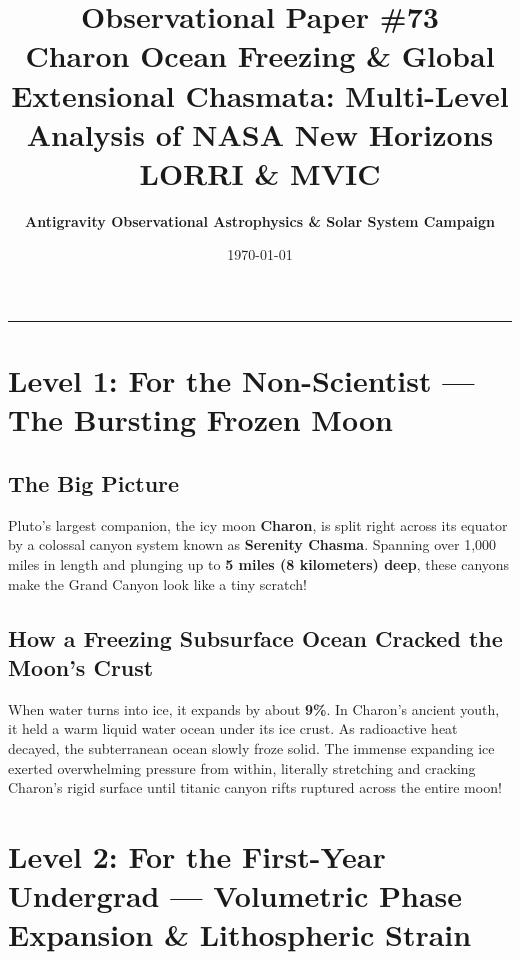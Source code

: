 \documentclass[11pt,a4paper]{article}
\title{\Huge \textbf{Observational Paper \#73}\\ \Large Charon Ocean Freezing \& Global Extensional Chasmata: Multi-Level Analysis of NASA New Horizons LORRI \& MVIC}
\author{\textbf{Antigravity Observational Astrophysics \& Solar System Campaign}}
\date{\today}
\begin{document}
\maketitle

\vspace{-1em}
\begin{center}
\rule{\textwidth}{1.5pt}
\end{center}

\section*{Level 1: For the Non-Scientist — The Bursting Frozen Moon}

\subsection*{The Big Picture}
Pluto's largest companion, the icy moon \textbf{Charon}, is split right across its equator by a colossal canyon system known as \textbf{Serenity Chasma}. Spanning over 1,000 miles in length and plunging up to \textbf{5 miles (8 kilometers) deep}, these canyons make the Grand Canyon look like a tiny scratch!

\subsection*{How a Freezing Subsurface Ocean Cracked the Moon's Crust}
When water turns into ice, it expands by about \textbf{9\%}. In Charon's ancient youth, it held a warm liquid water ocean under its ice crust. As radioactive heat decayed, the subterranean ocean slowly froze solid. The immense expanding ice exerted overwhelming pressure from within, literally stretching and cracking Charon's rigid surface until titanic canyon rifts ruptured across the entire moon!

\newpage

\section*{Level 2: For the First-Year Undergrad — Volumetric Phase Expansion \& Lithospheric Strain}
\end{document}
